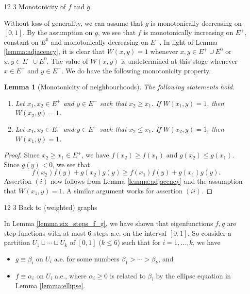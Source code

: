 \documentclass[11pt]{article}
\makeatletter
\renewcommand\subsection{\@startsection{subsection}{2}{\z@}%
{12\p@ \@plus 6\p@ \@minus 3\p@}%
{3\p@ \@plus 6\p@ \@minus 3\p@}%
{\bfseries\boldmath}}
\theoremstyle{plain}
\newtheorem{lemma}[theorem]{Lemma}
\theoremstyle{definition}
\numberwithin{equation}{section}
\makeatother
\begin{document}
\subsection{Monotonicity of $f$ and $g$}

Without loss of generality, we can assume that $g$ is monotonically decreasing on $[0,1]$. 
By the assumption on $g$, we see that $f$ is monotonically increasing on $E^+$, 
constant on $E^0$ and monotonically decreasing on $E^-$. In light of Lemma \ref{lemma:adjacency}, 
it is clear that $W(x,y)=1$ whenever $x,y\in E^+\cup E^0$ or $x,y\in E^-\cup E^0$. 
The value of $W(x,y)$ is undetermined at this stage whenever $x\in E^+$ 
and $y\in E^-$. We do have the following monotonicity property.

\begin{lemma}[Monotonicity of neighbourhoods]\label{lemma:monotonicity} 
The following statements hold.
\begin{enumerate}[$(i)$]
\item Let $x_1,x_2\in E^+$ and $y\in E^-$ such that $x_2\geq x_1$. If $W(x_1,y)=1$, then $W(x_2,y)=1$.   
\item Let $x_1,x_2\in E^-$ and $y\in E^+$ such that $x_2\leq x_1$. If $W(x_2,y)=1$, then $W(x_1,y)=1$. 
\end{enumerate}
\end{lemma}

\begin{proof}
Since $x_2\geq x_1\in E^+$, we have $f(x_2)\geq f(x_1)$ and $g(x_2)\leq g(x_1)$. 
Since $g(y)<0$, we see that 
\[
f(x_2)f(y)+g(x_2)g(y)\geq f(x_1)f(y) + g(x_1)g(y).
\]
Assertion $(i)$ now follows from Lemma \ref{lemma:adjacency} and the assumption that $W(x_1, y)=1$. 
A similar argument works for assertion $(ii)$.
\end{proof}

\subsection{Back to (weighted) graphs}

In Lemma \ref{lemma:six_steps_f_g}, we have shown that eigenfunctions $f,g$ are step-functions 
with at most $6$ steps a.e. on the interval $[0,1]$. So consider a partition 
$U_1\sqcup \cdots \sqcup U_k$ of $[0,1]$ ($k\leq 6$) such that for $i=1,\ldots, k$, we have 
\begin{itemize}
\item $g\equiv \beta_i$ on $U_i$ a.e. for some numbers $\beta_1>\cdots >\beta_k$, and
\item $f\equiv \alpha_i$ on $U_i$ a.e., where $\alpha_i\ge 0$ is related to $\beta_i$ 
by the ellipse equation in Lemma \ref{lemma:ellipse}.
\end{itemize}
\end{document}
